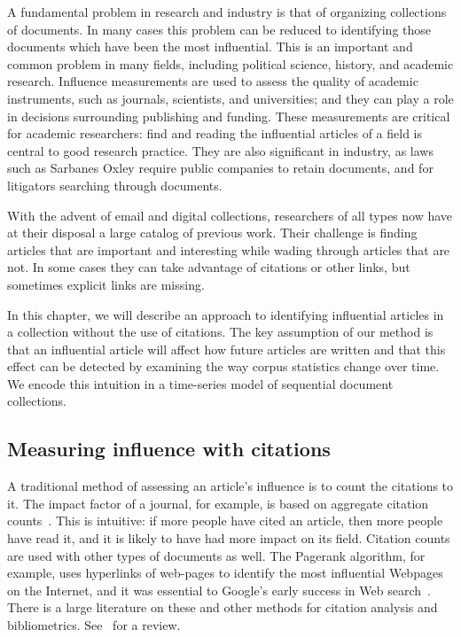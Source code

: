 \label{chapter:influence}

A fundamental problem in research and industry is that of organizing
collections of documents.  In many cases this problem can be reduced
to identifying those documents which have been the most influential.
This is an important and common problem in many fields, including
political science, history, and academic research.  Influence
measurements are used to assess the quality of academic instruments,
such as journals, scientists, and universities; and they can play a
role in decisions surrounding publishing and funding. These
measurements are critical for academic researchers: find and reading
the influential articles of a field is central to good research
practice.  They are also significant in industry, as laws such as
Sarbanes Oxley require public companies to retain documents, and for
litigators searching through documents.

With the advent of email and digital collections, researchers of all
types now have at their disposal a large catalog of previous work.
Their challenge is finding articles that are important and interesting
while wading through articles that are not.  In some cases they can
take advantage of citations or other links, but sometimes explicit
links are missing.

In this chapter, we will describe an approach to identifying
influential articles in a collection without the use of citations.
The key assumption of our method is that an influential article will
affect how future articles are written and that this effect can be
detected by examining the way corpus statistics change over time.  We
encode this intuition in a time-series model of sequential document
collections.

\subsection*{Measuring influence with citations}

A traditional method of assessing an article's influence is to count
the citations to it. The impact factor of a journal, for example, is
based on aggregate citation counts~\cite{garfield:2002}.  This is
intuitive: if more people have cited an article, then more people have
read it, and it is likely to have had more impact on its field.
Citation counts are used with other types of documents as well.  The
Pagerank algorithm, for example, uses hyperlinks of web-pages to
identify the most influential Webpages on the Internet, and it was
essential to Google's early success in Web search~\cite{brin:1998}.
There is a large literature on these and other methods for citation
analysis and bibliometrics.  See~\cite{osareh:1996} for a review.

